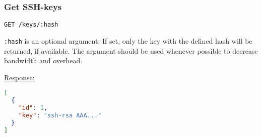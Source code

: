 %
%
%
%
%
%
%


\subsubsection{Get SSH-keys}

\begin{lstlisting}[language=http_request]
GET /keys/:hash
\end{lstlisting}

\lstinline[language=http_request]{:hash} is an optional argument. If set, only
the key with the defined hash will be returned, if available. The argument
should be used whenever possible to decrease bandwidth and overhead.

{\tiny \underline{Response:}}
\begin{lstlisting}[language=json, numbers=none]
[
  {
    "id": 1,
    "key": "ssh-rsa AAA..."
  }
]
\end{lstlisting}
